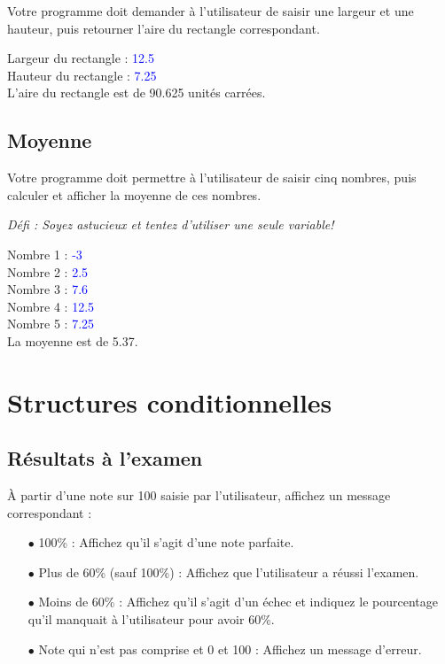 \documentclass[12pt]{article}
\newenvironment{console}
	{
	\tcolorbox[title={Sortie console}, sharp corners = south, boxsep = 1.5mm]{} \tt
	}{\endtcolorbox}
\begin{document}
Votre programme doit demander à l'utilisateur de saisir une largeur et une hauteur, puis retourner l'aire du rectangle correspondant.

\begin{console}
Largeur du rectangle :  \textcolor{blue}{12.5} \\
Hauteur du rectangle :  \textcolor{blue}{7.25} \\[\baselineskip]
L'aire du rectangle est de 90.625 unités carrées.
\end{console}

%
%
%
%

\subsection{Moyenne}

Votre programme doit permettre à l’utilisateur de saisir cinq nombres, puis calculer et afficher la moyenne de ces nombres.

\textit{Défi : Soyez astucieux et tentez d'utiliser une seule variable!}

\begin{console}
Nombre 1 :  \textcolor{blue}{-3} \\
Nombre 2 :  \textcolor{blue}{2.5} \\
Nombre 3 :  \textcolor{blue}{7.6} \\
Nombre 4 :  \textcolor{blue}{12.5} \\
Nombre 5 :  \textcolor{blue}{7.25} \\[\baselineskip]
La moyenne est de 5.37.
\end{console}



%
%

\section{Structures conditionnelles}


\subsection{Résultats à l'examen}

À partir d'une note sur 100 saisie par l'utilisateur, affichez un message correspondant :

\begin{itemize}
	\item[$\bullet$] 100\% : Affichez qu'il s'agit d'une note parfaite.
	\item[$\bullet$] Plus de 60\% (sauf 100\%) : Affichez que l'utilisateur a réussi l'examen.
	\item[$\bullet$] Moins de 60\% : Affichez qu'il s'agit d'un échec et indiquez le pourcentage qu'il manquait à l'utilisateur pour avoir 60\%.
	\item[$\bullet$] Note qui n'est pas comprise et 0 et 100 : Affichez un message d'erreur.
\end{itemize}
\end{document}
